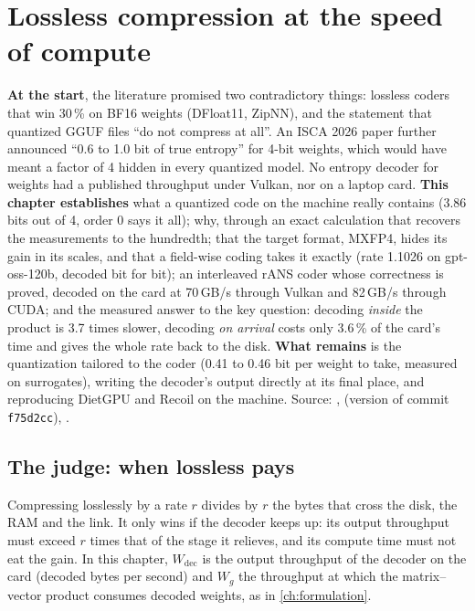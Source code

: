 \chapter{Lossless compression at the speed of compute}\label{ch:entropie}

\begin{origine}
\textbf{At the start}, the literature promised two contradictory things: lossless coders that win 30\,\% on BF16 weights (DFloat11, ZipNN), and the statement that quantized GGUF files ``do not compress at all''. An ISCA 2026 paper further announced ``0.6 to 1.0 bit of true entropy'' for 4-bit weights, which would have meant a factor of 4 hidden in every quantized model. No entropy decoder for weights had a published throughput under Vulkan, nor on a laptop card.
\textbf{This chapter establishes} what a quantized code on the machine really contains (3.86 bits out of 4, order 0 says it all); why, through an exact calculation that recovers the measurements to the hundredth; that the target format, MXFP4, hides its gain in its scales, and that a field-wise coding takes it exactly (rate 1.1026 on gpt-oss-120b, decoded bit for bit); an interleaved rANS coder whose correctness is proved, decoded on the card at 70\,GB/s through Vulkan and 82\,GB/s through CUDA; and the measured answer to the key question: decoding \emph{inside} the product is 3.7 times slower, decoding \emph{on arrival} costs only 3.6\,\% of the card's time and gives the whole rate back to the disk.
\textbf{What remains} is the quantization tailored to the coder (0.41 to 0.46 bit per weight to take, measured on surrogates), writing the decoder's output directly at its final place, and reproducing DietGPU and Recoil on the machine.
Source: ,  (version of commit \texttt{f75d2cc}), .
\end{origine}

\section{The judge: when lossless pays}\label{sec:ent-juge}

Compressing losslessly by a rate $r$ divides by $r$ the bytes that cross the disk, the RAM and the link. It only wins if the decoder keeps up: its output throughput must exceed $r$ times that of the stage it relieves, and its compute time must not eat the gain. In this chapter, $W_{\mathrm{dec}}$ is the output throughput of the decoder on the card (decoded bytes per second) and $W_g$ the throughput at which the matrix--vector product consumes decoded weights, as in \cref{ch:formulation}.

